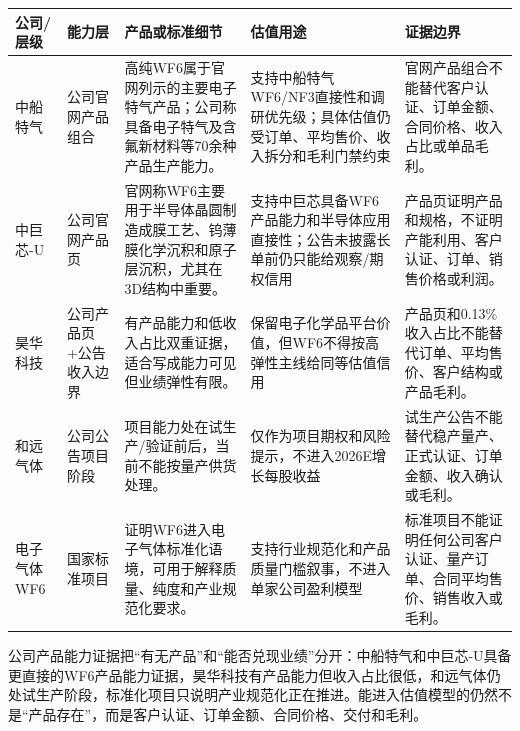 \begin{exhibitbox}[公司产品能力官方证据]
\scriptsize
\begin{tabularx}{\exhibitboxwidth}{L{1.6cm} L{1.7cm} X X X}
\toprule
\textbf{公司/层级} & \textbf{能力层} & \textbf{产品或标准细节} & \textbf{估值用途} & \textbf{证据边界} \\
\midrule
中船特气 & 公司官网产品组合 & 高纯WF6属于官网列示的主要电子特气产品；公司称具备电子特气及含氟新材料等70余种产品生产能力。 & 支持中船特气WF6/NF3直接性和调研优先级；具体估值仍受订单、平均售价、收入拆分和毛利门禁约束 & 官网产品组合不能替代客户认证、订单金额、合同价格、收入占比或单品毛利。 \\
中巨芯-U & 公司官网产品页 & 官网称WF6主要用于半导体晶圆制造成膜工艺、钨薄膜化学沉积和原子层沉积，尤其在3D结构中重要。 & 支持中巨芯具备WF6产品能力和半导体应用直接性；公告未披露长单前仍只能给观察/期权信用 & 产品页证明产品和规格，不证明产能利用、客户认证、订单、销售价格或利润。 \\
昊华科技 & 公司产品页+公告收入边界 & 有产品能力和低收入占比双重证据，适合写成能力可见但业绩弹性有限。 & 保留电子化学品平台价值，但WF6不得按高弹性主线给同等估值信用 & 产品页和0.13\%收入占比不能替代订单、平均售价、客户结构或产品毛利。 \\
和远气体 & 公司公告项目阶段 & 项目能力处在试生产/验证前后，当前不能按量产供货处理。 & 仅作为项目期权和风险提示，不进入2026E增长每股收益 & 试生产公告不能替代稳产量产、正式认证、订单金额、收入确认或毛利。 \\
电子气体WF6 & 国家标准项目 & 证明WF6进入电子气体标准化语境，可用于解释质量、纯度和产业规范化要求。 & 支持行业规范化和产品质量门槛叙事，不进入单家公司盈利模型 & 标准项目不能证明任何公司客户认证、量产订单、合同平均售价、销售收入或毛利。 \\
\bottomrule
\end{tabularx}
\end{exhibitbox}

公司产品能力证据把“有无产品”和“能否兑现业绩”分开：中船特气和中巨芯-U具备更直接的WF6产品能力证据，昊华科技有产品能力但收入占比很低，和远气体仍处试生产阶段，标准化项目只说明产业规范化正在推进。能进入估值模型的仍然不是“产品存在”，而是客户认证、订单金额、合同价格、交付和毛利。

